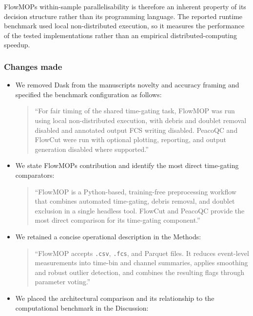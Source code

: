 \documentclass[
  11pt,
  a4paper,
]{article}
\begin{document}
FlowMOP\textquotesingle s within-sample parallelisability is therefore
an inherent property of its decision structure rather than its
programming language. The reported runtime benchmark used local
non-distributed execution, so it measures the performance of the tested
implementations rather than an empirical distributed-computing speedup.

\subsubsection{Changes made}\label{changes-made-1}

\begin{itemize}
\item
  We removed Dask from the manuscript\textquotesingle s novelty and
  accuracy framing and specified the benchmark configuration as follows:

  \begin{quote}
  ``For fair timing of the shared time-gating task, FlowMOP was run
  using local non-distributed execution, with debris and doublet removal
  disabled and annotated output FCS writing disabled. PeacoQC and
  FlowCut were run with optional plotting, reporting, and output
  generation disabled where supported.''
  \end{quote}
\item
  We state FlowMOP\textquotesingle s contribution and identify the most
  direct time-gating comparators:

  \begin{quote}
  ``FlowMOP is a Python-based, training-free preprocessing workflow that
  combines automated time-gating, debris removal, and doublet exclusion
  in a single headless tool. FlowCut and PeacoQC provide the most direct
  comparison for its time-gating component.''
  \end{quote}
\item
  We retained a concise operational description in the Methods:

  \begin{quote}
  ``FlowMOP accepts \texttt{.csv}, \texttt{.fcs}, and Parquet files. It
  reduces event-level measurements into time-bin and channel summaries,
  applies smoothing and robust outlier detection, and combines the
  resulting flags through parameter voting.''
  \end{quote}
\item
  We placed the architectural comparison and its relationship to the
  computational benchmark in the Discussion:


\end{itemize}
\end{document}
